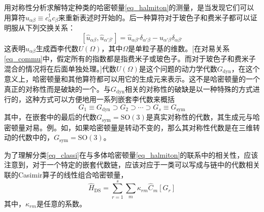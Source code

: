 用对称性分析求解特定种类的哈密顿量\ref{eq_halmiton}的测量，是当发现它们可以用算符$\widehat{u}_{\alpha\beta}\equiv c_{\alpha}^\dag c_\beta$来重新表述时开始的。后一种算符对于玻色子和费米子都可以证明服从下列交换关系：
\begin{equation}\label{eq_commu}
[\widehat{u}_{\alpha\beta},\widehat{u}_{\alpha'\beta'}]=\widehat{u}_{\alpha\beta'}\delta_{\alpha'\beta}-\widehat{u}_{\alpha'\beta}\delta_{\alpha\beta'}
\end{equation}
这表明$\widehat{u}_{\alpha\beta}$生成酉李代数$U(\Omega)$，其中$\Omega$是单粒子基的维数。[在对易关系\ref{eq_commu}中，假定所有的指数都是指费米子或玻色子。而对于玻色子和费米子混合的情况将在后面单独处理。]代数$U(\Omega)$是这个问题的动力学代数$G_\textrm{dyn}$，在这个意义上，哈密顿量和其他算符都可以用它的生成元来表示。这不是哈密顿量的一个真正的对称性而是破缺的一个。与$G_\textrm{dyn}$相关的对称性的破缺是以一种特殊的方式进行的，这种方式可以方便地用一系列嵌套李代数来概括
\begin{equation}\label{eq_classi}
G_1\equiv G_\textrm{dyn}\supset G_2\supset\cdots\supset G_s\equiv G_\textrm{sym}
\end{equation}
其中，在嵌套中的最后的代数$G_\textrm{sym}=\textrm{SO}(3)$是真实对称性的代数，其生成元与哈密顿量对易。例。如，如果哈密顿量是转动不变的，那么其对称性代数是在三维转动的代数中的，$G_\textrm{sym}=\textrm{SO}(3)$。

为了理解分类\ref{eq_classi}在与多体哈密顿量\ref{eq_halmiton}的联系中的相关性，应该注意到，对于一个特定的嵌套代数链，应该对应于一类可以写成与链中的代数相关联的Casimir算子的线性组合哈密顿量，
\begin{equation}
\widehat{H}_\textrm{DS}=\sum_{r=1}^s\sum_m\kappa_{rm}\widehat{C}_m[G_r]
\end{equation}
其中，$\kappa_{rm}$是任意的系数。